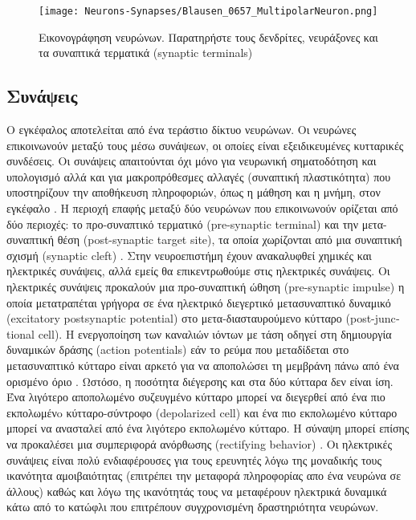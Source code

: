 \documentclass[12pt]{report}
\begin{document}
\begin{figure}[htp]
    \centering
    \texttt{[image: Neurons-Synapses/Blausen\_0657\_MultipolarNeuron.png]}
    \caption{Εικονογράφηση νευρώνων. Παρατηρήστε τους δενδρίτες,  νευράξονες και τα συναπτικά τερματικά (\textlatin{synaptic terminals}) }
    \label{fig:neurons-multipolar}
\end{figure}
\subsection{Συνάψεις}
Ο εγκέφαλος αποτελείται από ένα τεράστιο δίκτυο νευρώνων. Οι νευρώνες επικοινωνούν μεταξύ τους μέσω συνάψεων, οι οποίες είναι εξειδικευμένες κυτταρικές συνδέσεις. Οι συνάψεις απαιτούνται όχι μόνο για νευρωνική σηματοδότηση και υπολογισμό αλλά και για μακροπρόθεσμες αλλαγές (συναπτική πλαστικότητα) που υποστηρίζουν την αποθήκευση πληροφοριών, όπως η μάθηση και η μνήμη, στον εγκέφαλο \cite{li2003}. Η περιοχή επαφής μεταξύ δύο νευρώνων που επικοινωνούν ορίζεται από δύο περιοχές: το προ-συναπτικό τερματικό (\textlatin{pre-synaptic terminal}) και την μετα-συναπτική θέση (\textlatin{post-synaptic target site}), τα οποία χωρίζονται από μια συναπτική σχισμή (\textlatin{synaptic cleft}) .
Στην νευροεπιστήμη έχουν ανακαλυφθεί χημικές και ηλεκτρικές συνάψεις, αλλά εμείς θα επικεντρωθούμε στις ηλεκτρικές συνάψεις. Οι ηλεκτρικές συνάψεις προκαλούν μια προ-συναπτική ώθηση (\textlatin{pre-synaptic impulse}) η οποία μετατραπέται γρήγορα σε ένα ηλεκτρικό διεγερτικό μετασυναπτικό δυναμικό (\textlatin{excitatory postsynaptic potential}) στο μετα-διασταυρούμενο κύτταρο (\textlatin{post-junctional cell}). Η ενεργοποίηση των καναλιών ιόντων με τάση οδηγεί στη δημιουργία δυναμικών δράσης (\textlatin{action potentials})  εάν το ρεύμα που μεταδίδεται στο μετασυναπτικό κύτταρο είναι αρκετό για να αποπολώσει τη μεμβράνη πάνω από ένα ορισμένο όριο \cite{Hormuzdi2004}. Ωστόσο, η ποσότητα διέγερσης και στα δύο κύτταρα δεν είναι ίση. Ένα λιγότερο αποπολωμένο συζευγμένο κύτταρο μπορεί να διεγερθεί από ένα πιο εκπολωμένo κύτταρο-σύντροφο (\textlatin{depolarized cell}) και ένα πιο εκπολωμένο κύτταρο μπορεί να ανασταλεί από ένα λιγότερο εκπολωμένο κύτταρο. Η σύναψη μπορεί επίσης να προκαλέσει μια συμπεριφορά ανόρθωσης (\textlatin{rectifying behavior}) \cite{Furshpan1959}. Οι ηλεκτρικές συνάψεις είναι πολύ ενδιαφέρουσες για τους ερευνητές λόγω της μοναδικής τους ικανότητα αμοιβαιότητας (επιτρέπει την μεταφορά πληροφορίας απο ένα νευρώνα σε άλλους) καθώς και λόγω της ικανότητάς τους να μεταφέρουν ηλεκτρικά δυναμικά κάτω από το κατώφλι που επιτρέπουν συγχρονισμένη δραστηριότητα νευρώνων.
\end{document}
